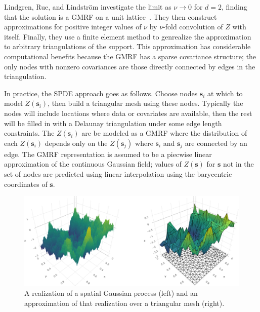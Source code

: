 \documentclass[]{interact}
\begin{document}
Lindgren, Rue, and Lindstr\"{o}m investigate the limit as \(\nu \to 0\) for
\(d = 2\), finding that the solution is a GMRF on a unit
lattice~\cite{lindgrenetal}. They then construct approximations for positive
integer values of \(\nu\) by \(\nu\)-fold convolution of \(Z\) with itself.
Finally, they use a finite element method to genrealize the approximation
to arbitrary triangulations of the support. This approximation has considerable
computational benefits because the GMRF has a sparse covariance structure; the
only nodes with nonzero covariances are those directly connected by edges in
the triangulation.

In practice, the SPDE approach goes as follows. Choose nodes \(\mathbf{s}_{i}\)
at which to model \(Z(\mathbf{s}_{i})\), then build a triangular mesh using these
nodes. Typically the nodes will include locations where data or covariates are
available, then the rest will be filled in with a Delaunay triangulation under
some edge length constraints. The \(Z(\mathbf{s}_{i})\) are be modeled as a
GMRF where the distribution of each \(Z(\mathbf{s}_{i})\) depends only on the
\(Z(\mathbf{s}_{j})\) where \(\mathbf{s}_{i}\) and \(\mathbf{s}_{j}\) are
connected by an edge. The GMRF representation is assumed to be a piecwise
linear approximation of the continuous Gaussian field; values of
\(Z(\mathbf{s})\) for \(\mathbf{s}\) not in the set of nodes are predicted
using linear interpolation using the barycentric coordinates of
\(\mathbf{s}\).




\begin{figure}[p]
\includegraphics[width=\textwidth]{figures/surface.png}
\caption{A realization of a spatial Gaussian process (left) and an
approximation of that realization over a triangular mesh (right).}
\label{surface}
\end{figure}
\end{document}
